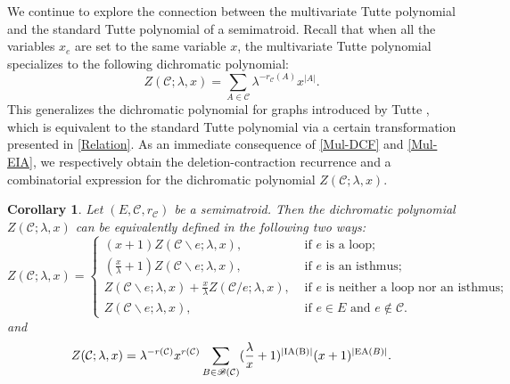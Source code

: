 \documentclass[12pt]{article}%
\numberwithin{equation}{section}
\newtheorem{corollary}[corollary]{Corollary}
\begin{document}
We continue to explore the connection between the multivariate Tutte polynomial and the standard Tutte polynomial of a semimatroid. Recall that when all the variables $x_e$ are set to the same variable $x$, the multivariate Tutte polynomial specializes to the following dichromatic polynomial:
\[
Z(\mathcal{C};\lambda,x)=\sum_{A\in\mathcal{C}}\lambda^{-r_\mathcal{C}(A)}x^{|A|}.
\]
This generalizes the dichromatic polynomial for graphs introduced by Tutte \cite{Tutte1967}, which is equivalent to the standard Tutte polynomial via a certain transformation presented in \eqref{Relation}. As an immediate consequence of \autoref{Mul-DCF} and \autoref{Mul-EIA}, we respectively obtain the deletion-contraction recurrence and a combinatorial expression for the dichromatic polynomial $Z(\mathcal{C};\lambda,x)$.
\begin{corollary}\label{Mul-Dichromatic-IEA}
Let $(E,\mathcal{C},r_{\mathcal{C}})$ be a semimatroid. Then the dichromatic polynomial $Z(\mathcal{C};\lambda,x)$ can be equivalently defined in the following two ways:
\[
Z(\mathcal{C};\lambda,x)=
\begin{cases}
(x+1)Z(\mathcal{C}\backslash e;\lambda,x),&\text{ if } e \text{ is a loop};\\
(\frac{x}{\lambda}+1)Z(\mathcal{C}\backslash e;\lambda,x),&\text{ if } e \text{ is an isthmus};\\
Z(\mathcal{C}\backslash e;\lambda,x)+\frac{x}{\lambda}Z(\mathcal{C}/e;\lambda,x),&\text{ if } e \text{ is neither a loop nor an isthmus};\\
Z(\mathcal{C}\backslash e;\lambda,x),&\text{ if } e\in E \text{ and } e\notin\mathcal{C}.
\end{cases}
\]
and
\[
Z(\mathcal{C};\lambda,x)=\lambda^{-r(\mathcal{C})}x^{r(\mathcal{C})}\sum_{B\in\mathscr{B}(\mathcal{C})}(\frac{\lambda}{x}+1)^{|{\rm IA(B)}|}(x+1)^{|{\rm EA}(B)|}.
\]
\end{corollary}
\end{document}
